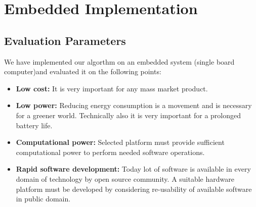 
\chapter{Embedded Implementation} %
\section {Evaluation Parameters}
\label{Chapter3}
We have implemented our algorthm on an embedded system (single board
computer)and evaluated it on the following points:
\begin{itemize}
 \item \textbf{Low cost:} It is very important for any mass
 market product.
 \item \textbf{Low power:} Reducing energy consumption is a
 movement and is necessary for a greener world.
 Technically also it is very important for a prolonged
 battery life.
 \item \textbf{Computational power:} Selected platform must
 provide sufficient computational power to perform
 needed software operations.
 \item \textbf{Rapid software development:} Today lot of software
 is available in every domain of technology by open source
 community. A suitable hardware platform must be developed by considering
 re-usability of available software in public domain.
\end{itemize}
